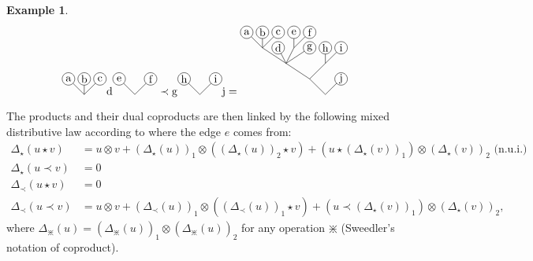 \documentclass[11pt,leqno]{amsart}
\theoremstyle{definition}
\newtheorem{example}[definition]{Example}
\theoremstyle{plain}
\begin{document}
\begin{example}
\begin{equation*}
\begin{tikzpicture}[scale=0.5]
\draw (-2,4)--(-3,3)--(-4,4);
\draw (-3,3)--(-3,4);
\draw[black, fill=white] (-2,4) circle (0.4);
\draw[black, fill=white] (-3,4) circle (0.4);
\draw[black, fill=white] (-4,4) circle (0.4);
\draw(-2,4) node{c};
\draw(-3,4) node{b};
\draw(-4,4) node{a};
\end{tikzpicture}
\text{d} 
\begin{tikzpicture}[scale=0.5]
\draw (-1,1)--(0,0)--(1,1);
\draw[black, fill=white] (1,1) circle (0.4);
\draw[black, fill=white] (-1,1) circle (0.4);
\draw(1,1) node{f};
\draw(-1,1) node{e};
\end{tikzpicture}
\prec
\text{g}
\begin{tikzpicture}[scale=0.5]
\draw (-1,1)--(0,0)--(1,1);
\draw[black, fill=white] (1,1) circle (0.4);
\draw[black, fill=white] (-1,1) circle (0.4);
\draw(1,1) node{i};
\draw(-1,1) node{h};
\end{tikzpicture}
\text{j}
=
\begin{tikzpicture}[scale=0.5]
\draw (1,1)--(0,0)--(-1,1);
\draw (-2.5,2)--(-1,1)--(0,2);
\draw (0,3)--(0,2)--(1,3);
\draw (-4,3)--(-2.5,2)--(-3,3);
\draw (-2,3)--(-2.5,2)--(-1,3);
\draw (-2,4)--(-2,3)--(-1,4);
\draw (-5,4)--(-4,3)--(-4,4);
\draw (-4,3)--(-3,4);
\draw[black, fill=white] (1,1) circle (0.4);
\draw[black, fill=white] (0,3) circle (0.4);
\draw[black, fill=white] (1,3) circle (0.4);
\draw[black, fill=white] (-3,3) circle (0.4);
\draw[black, fill=white] (-1,3) circle (0.4);
\draw[black, fill=white] (-5,4) circle (0.4);
\draw[black, fill=white] (-4,4) circle (0.4);
\draw[black, fill=white] (-3,4) circle (0.4);
\draw[black, fill=white] (-2,4) circle (0.4);
\draw[black, fill=white] (-1,4) circle (0.4);
\draw(1,1) node{j};
\draw(0,3) node{h};
\draw(1,3) node{i};
\draw(-3,3) node{d};
\draw(-1,3) node{g};
\draw(-5,4) node{a};
\draw(-4,4) node{b};
\draw(-3,4) node{c};
\draw(-2,4) node{e};
\draw(-1,4) node{f};
\end{tikzpicture}
\end{equation*}
\end{example} 

The products and their dual coproducts are then linked by the following mixed distributive law according to where the edge $e$ comes from:
\begin{align*}
\Delta_\star(u \star v)&= u \otimes v + \left(\Delta_\star(u)\right)_1 \otimes \left(\left(\Delta_\star(u)\right)_2 \star v \right) + \left(u \star \left(\Delta_\star(v)\right)_1 \right)\otimes \left(\Delta_\star(v)\right)_2\text{ (n.u.i.)}\\
\Delta_\star(u \prec v)&= 0\\
\Delta_\prec(u \star v)&= 0\\
\Delta_\prec(u \prec v)&= u \otimes v +  \left(\Delta_\prec(u)\right)_1 \otimes \left(  \left(\Delta_\prec(u)\right)_1 \star v \right) + \left( u \prec  \left(\Delta_\star(v)\right)_1 \right) \otimes  \left(\Delta_\star(v)\right)_2,
\end{align*}
where $\Delta_{\divideontimes}(u) = \left(\Delta_{\divideontimes}(u)\right)_1 \otimes \left(\Delta_{\divideontimes}(u)\right)_2$ for any operation ${\divideontimes}$ (Sweedler's notation of coproduct).



\end{document}
